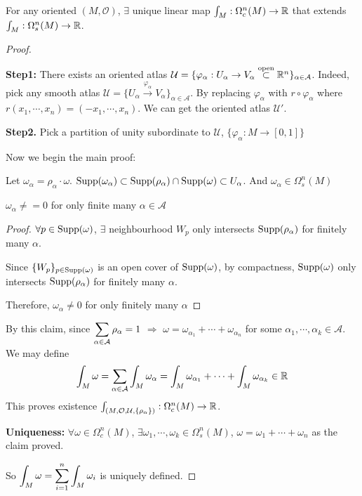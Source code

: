 \begin{theorem}
   For any oriented  $ (M,\mathcal{O}) $,  $ \exists $ unique linear map  $ \int_M:\Omega_c^n(M)\rightarrow\mathbb R $ that extends  $ \int_M:\Omega_s^n(M)\rightarrow \mathbb R $.   
\end{theorem}
\begin{proof}
   \,

   
   {\noindent\textbf{Step1:} There exists an oriented atlas  $ \mathcal{U}=\{\varphi_\alpha:U_\alpha\rightarrow V_\alpha\overset{\text{open}}{\subset}\mathbb R^n\}_{\alpha\in \mathcal{A}} $.
   }
   Indeed, pick any smooth atlas  $ \mathcal{U}=\{U_\alpha\xrightarrow{\varphi_\alpha} V_\alpha\}_{\alpha\in\mathcal{A}} $. By replacing  $ \varphi_\alpha $ with  $ r\circ \varphi_\alpha $ where  $ r(x_1,\cdots,x_n)=(-x_1,\cdots,x_n) $. We can get the oriented atlas  $ \mathcal{U}' $.
   
   {\noindent\textbf{Step2.} Pick a partition of unity subordinate to  $ \mathcal{U} $, $ \{\varphi_\alpha:M\rightarrow [0,1]\} $ }

   Now we begin the main proof:

   Let  $ \omega_\alpha=\rho_\alpha\cdot \omega $.  $ \mathrm{Supp}(\omega_\alpha)\subset \mathrm{Supp}(\rho_\alpha)\cap \mathrm{Supp}(\omega)\subset U_\alpha $. And  $ \omega_\alpha\in\Omega_s^n(M) $ 
   \begin{claim}
        $ \omega_\alpha\neq=0 $ for only finite many  $ \alpha\in\mathcal{A} $ 
   \end{claim}  
   \begin{proof}
        $ \forall p\in \mathrm{Supp}(\omega) $,  $ \exists $ neighbourhood $ W_p $ only intersects  $ \mathrm{Supp}(\rho_\alpha) $ for finitely many  $ \alpha $.
       
        Since  $ \{W_p\}_{p\in\mathrm{Supp}(\omega)} $ is an open cover of  $ \mathrm{Supp}(\omega) $, by compactness,  $ \mathrm{Supp}(\omega) $ only intersects  $ \mathrm{Supp}(\rho_\alpha) $ for finitely many  $ \alpha $.
        
       Therefore,  $ \omega_\alpha\neq0 $ for only finitely many  $ \alpha $  
   \end{proof}
   By this claim, since  $ \displaystyle\sum_{\alpha\in\mathcal{A}}\rho_\alpha=1 $ $ \Rightarrow $  $ \omega=\omega_{\alpha_1}+\cdots+\omega_{\alpha_n} $ for some  $ \alpha_1,\cdots,\alpha_k\in\mathcal{A} $.
   We may define 
   \begin{equation}
       \int_M\omega=\displaystyle\sum_{\alpha\in\mathcal{A}}\int_M\omega_\alpha=\int_M\omega_{\alpha_1}+\cdots+\int_M\omega_{\alpha_k}\in \mathbb R
   \end{equation}
   This proves existence  $ \int_{(M,\mathcal{O},\mathcal{U},\{\rho_\alpha\})}:\Omega_c^n(M)\rightarrow\mathbb R $.
   
   \textbf{Uniqueness:} $ \forall \omega\in \Omega_c^n(M) $,  $ \exists \omega_1,\cdots,\omega_k\in\Omega_s^n(M) $,  $ \omega=\omega_1+\cdots+\omega_n $ as the claim proved.
   
   So  $ \displaystyle\int_M\omega=\sum_{i=1}^n\int_M\omega_i $ is uniquely defined. 
\end{proof}
